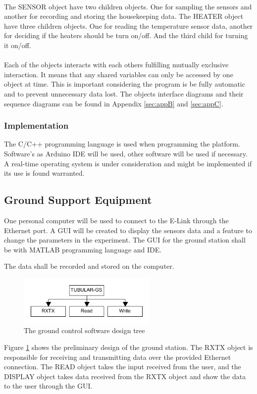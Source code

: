 \documentclass[a4paper,12pt,twoside]{article}
\begin{document}
\begin{enumerate}[label=(\alph*)]
\\
The SENSOR object have two children objects. One for sampling the sensors and another for recording and storing the housekeeping data. The HEATER object have three children objects. One for reading the temperature sensor data, another for deciding if the heaters should be turn on/off. And the third child for turning it on/off.\\ 
\\
Each of the objects interacts with each others fulfilling mutually exclusive interaction. It means that any shared variables can only be accessed by one object at time. This is important considering the program is be fully automatic and to prevent unnecessary data lost. The objects interface diagrams and their sequence diagrams can be found in Appendix \ref{sec:appB} and \ref{sec:appC}.
\end{enumerate}
\subsubsection{Implementation}
The C/C++ programming language is used when programming the platform. Software's as Arduino IDE will be used, other software will be used if necessary. A real-time operating system is under consideration and might be implemented if its use is found warranted. 


\raggedbottom
\pagebreak
\subsection{Ground Support Equipment}
One personal computer will be used to connect to the E-Link through the Ethernet port. A GUI will be created to display the sensors data and a feature to change the parameters in the experiment. The GUI for the ground station shall be with MATLAB programming language and IDE.\par
The data shall be recorded and stored on the computer. 
\begin{figure}[H]
    \centering
    \includegraphics[width=0.6\textwidth]{4-experiment-design/img/gc-software-V1-2.png}
    \caption{The ground control software design tree}
    \label{fig:gcModel}
\end{figure}
Figure \ref{fig:gcModel} shows the preliminary design of the ground station. The RXTX object is responsible for receiving and transmitting data over the provided Ethernet connection. The READ object takes the input received from the user, and the DISPLAY object takes data received from the RXTX object and show the data to the user through the GUI.
\end{document}
